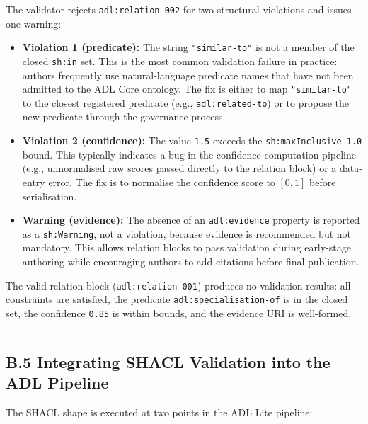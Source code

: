 The validator rejects \texttt{adl:relation-002} for two structural violations and issues one warning:

\begin{itemize}
\item
  \textbf{Violation 1 (predicate):} The string \texttt{"similar-to"} is not a member of the closed \texttt{sh:in} set. This is the most common validation failure in practice: authors frequently use natural-language predicate names that have not been admitted to the ADL Core ontology. The fix is either to map \texttt{"similar-to"} to the closest registered predicate (e.g., \texttt{adl:related-to}) or to propose the new predicate through the governance process.
\item
  \textbf{Violation 2 (confidence):} The value \texttt{1.5} exceeds the \texttt{sh:maxInclusive\ 1.0} bound. This typically indicates a bug in the confidence computation pipeline (e.g., unnormalised raw scores passed directly to the relation block) or a data-entry error. The fix is to normalise the confidence score to \([0, 1]\) before serialisation.
\item
  \textbf{Warning (evidence):} The absence of an \texttt{adl:evidence} property is reported as a \texttt{sh:Warning}, not a violation, because evidence is recommended but not mandatory. This allows relation blocks to pass validation during early-stage authoring while encouraging authors to add citations before final publication.
\end{itemize}

The valid relation block (\texttt{adl:relation-001}) produces no validation results: all constraints are satisfied, the predicate \texttt{adl:specialisation-of} is in the closed set, the confidence \texttt{0.85} is within bounds, and the evidence URI is well-formed.

\begin{center}\rule{0.5\linewidth}{0.5pt}\end{center}


\subsection{B.5 Integrating SHACL Validation into the ADL Pipeline}\label{b.5-integrating-shacl-validation-into-the-adl-pipeline}

The SHACL shape is executed at two points in the ADL Lite pipeline:

